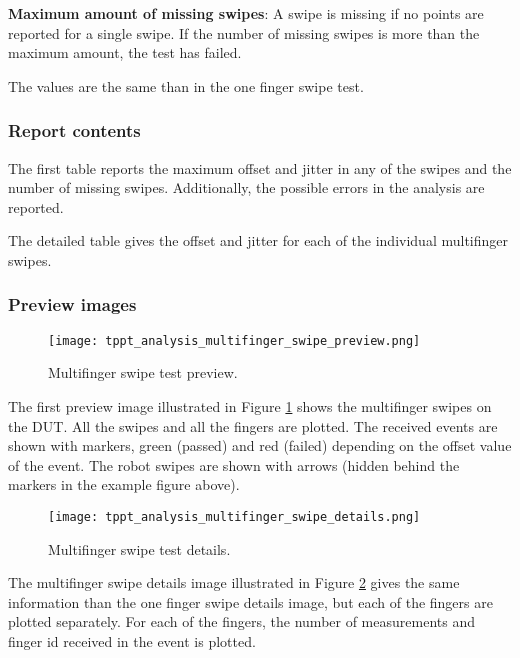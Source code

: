 \textbf{Maximum amount of missing swipes}: A swipe is missing if no points are reported for a single swipe. If the number of missing swipes is more than the maximum amount, the test has failed.

The values are the same than in the one finger swipe test.

\subsubsection{Report contents}

The first table reports the maximum offset and jitter in any of the swipes and the number of missing swipes. Additionally, the possible errors in the analysis are reported.

The detailed table gives the offset and jitter for each of the individual multifinger swipes.

\subsubsection{Preview images}

\begin{figure}[!h]
	\centering
	\texttt{[image: tppt\_analysis\_multifinger\_swipe\_preview.png]}
	\caption{Multifinger swipe test preview.}
	\label{fig:tppt_analysis_multifinger_swipe_preview}
\end{figure}

The first preview image illustrated in Figure \ref{fig:tppt_analysis_multifinger_swipe_preview} shows the multifinger swipes on the DUT. All the swipes and all the fingers are plotted. The received events are shown with markers, green (passed) and red (failed) depending on the offset value of the event. The robot swipes are shown with arrows (hidden behind the markers in the example figure above).

\begin{figure}[!h]
	\centering
	\texttt{[image: tppt\_analysis\_multifinger\_swipe\_details.png]}
	\caption{Multifinger swipe test details.}
	\label{fig:tppt_analysis_multifinger_swipe_details}
\end{figure}

The multifinger swipe details image illustrated in Figure \ref{fig:tppt_analysis_multifinger_swipe_details} gives the same information than the one finger swipe details image, but each of the fingers are plotted separately. For each of the fingers, the number of measurements and finger id received in the event is plotted.
